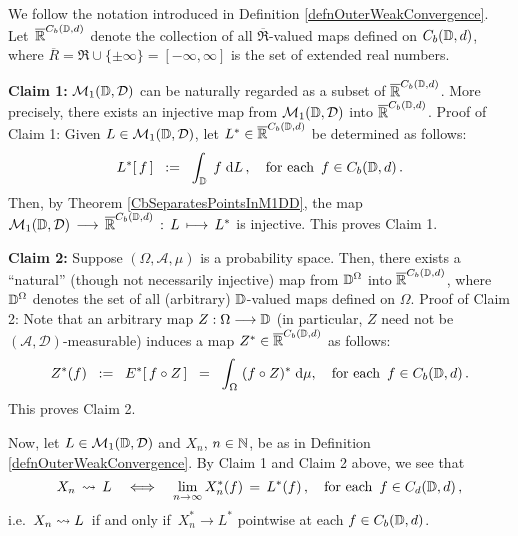\begin{remark}\mbox{}
\vskip 0.1cm
\noindent
We follow the notation introduced in Definition \ref{defnOuterWeakConvergence}.
Let \,$\overline{\mathbb{R}}^{C_{b}(\mathbb{D},d)}$ denote the collection of all $\overline{\Re}$-valued
maps defined on $C_{b}(\mathbb{D},d)$, where $\overline{R} = \Re\cup\{\pm\infty\} = [-\infty,\infty]$
is the set of extended real numbers.

\vskip 0.3cm
\noindent
\textnormal{\bf Claim 1:}\;\;
$\mathcal{M}_{1}(\mathbb{D},\mathcal{D})$ can be naturally regarded as a subset of $\overline{\mathbb{R}}^{C_{b}(\mathbb{D},d)}$.
\vskip 0.0cm\noindent
More precisely, there exists an injective map from $\mathcal{M}_{1}(\mathbb{D},\mathcal{D})$ into
$\overline{\mathbb{R}}^{C_{b}(\mathbb{D},d)}$.
\vskip 0.1cm
\noindent
Proof of Claim 1:\;
Given $L \in \mathcal{M}_{1}(\mathbb{D},\mathcal{D})$, let $L^{*} \in \overline{\mathbb{R}}^{C_{b}(\mathbb{D},d)}$
be determined as follows:
\begin{equation*}
L^{*}\!\left[\,f\,\right] \;\; := \;\; \int_{\mathbb{D}}\;f\;\textnormal{d} L\,,
\quad
\textnormal{for each \,$f\in C_{b}(\mathbb{D},d)$}\,.
\end{equation*}
Then, by Theorem \ref{CbSeparatesPointsInM1DD}, the map
\;$\mathcal{M}_{1}(\mathbb{D},\mathcal{D}) \,\longrightarrow\, \overline{\mathbb{R}}^{C_{b}(\mathbb{D},d)} \,:\, L \,\longmapsto\, L^{*}$\;
is injective. This proves Claim 1.

\vskip 0.5cm
\noindent
\textnormal{\bf Claim 2:}\;\;
Suppose $(\Omega,\mathcal{A},\mu)$ is a probability space.
Then, there exists a ``natural'' (though not necessarily injective) map from $\mathbb{D}^{\Omega}$
into $\overline{\mathbb{R}}^{C_{b}(\mathbb{D},d)}$, where $\mathbb{D}^{\Omega}$ denotes the set of all
(arbitrary) $\mathbb{D}$-valued maps defined on $\Omega$.
\vskip 0.1cm
\noindent
Proof of Claim 2:\;
Note that an arbitrary map $Z : \Omega \longrightarrow \mathbb{D}$
(in particular, $Z$ need not be $(\mathcal{A},\mathcal{D})$-measurable)
induces a map $Z^{*} \in \overline{\mathbb{R}}^{C_{b}(\mathbb{D},d)}$ as follows:
\begin{equation*}
Z^{*}\!\left(f\right)
\;\; := \;\; E^{*}\!\left[\,f \circ Z\,\right]
\;\;  = \;\; \int_{\Omega}\;(f \circ Z)^{*} \;\textnormal{d}\mu,
\quad
\textnormal{for each \,$f \in C_{b}(\mathbb{D},d)$}\,.
\end{equation*}
This proves Claim 2.

\vskip 0.5cm
\noindent
Now, let $L \in \mathcal{M}_{1}(\mathbb{D},\mathcal{D})$ and $X_{n}$, $n \in \mathbb{N}$,
be as in Definition \ref{defnOuterWeakConvergence}.
By Claim 1 and Claim 2 above, we see that
\begin{equation*}
X_{n} \,\rightsquigarrow\, L
\quad\Longleftrightarrow\quad
\underset{n\rightarrow\infty}{\lim}\, X_{n}^{*}(f) \,=\, L^{*}(f)\,,
\quad\textnormal{for each \,$f \in C_{d}(\mathbb{D},d)$}\,,
\end{equation*}
i.e. \,$X_{n} \rightsquigarrow L$\, if and only if
\,$X_{n}^{*} \longrightarrow L^{*}$ pointwise at each $f \in C_{b}(\mathbb{D},d)$.

\end{remark}


\renewcommand{\theenumi}{\roman{enumi}}
\renewcommand{\labelenumi}{\textnormal{(\theenumi)}$\;\;$}

